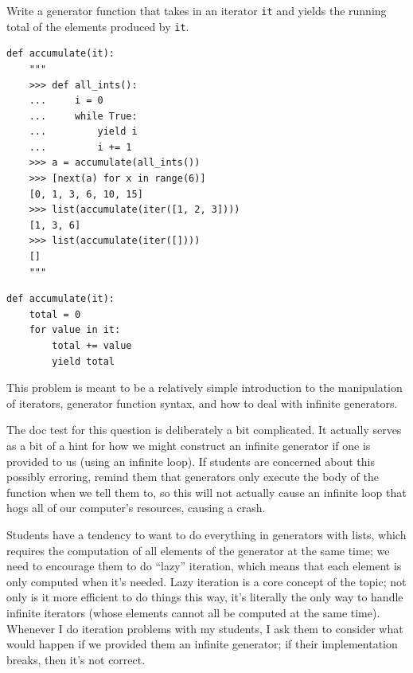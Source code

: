 \begin{blocksection}
\question Write a generator function that takes in an iterator \lstinline{it} and yields the running total of the elements produced by \lstinline{it}. 

\begin{lstlisting}
def accumulate(it):
    """
    >>> def all_ints():
    ...     i = 0
    ...     while True:
    ...         yield i
    ...         i += 1
    >>> a = accumulate(all_ints())
    >>> [next(a) for x in range(6)]
    [0, 1, 3, 6, 10, 15]
    >>> list(accumulate(iter([1, 2, 3])))
    [1, 3, 6]
    >>> list(accumulate(iter([])))
    []
    """
\end{lstlisting}

\begin{solution}[2in]
\begin{lstlisting}
def accumulate(it):
    total = 0
    for value in it:
        total += value
        yield total
\end{lstlisting}
\end{solution}
\end{blocksection}

\begin{questionmeta}
This problem is meant to be a relatively simple introduction to the manipulation of iterators, generator function syntax, and how to deal with infinite generators. 

The doc test for this question is deliberately a bit complicated. It actually serves as a bit of a hint for how we might construct an infinite generator if one is provided to us (using an infinite loop). If students are concerned about this possibly erroring, remind them that generators only execute the body of the function when we tell them to, so this will not actually cause an infinite loop that hogs all of our computer's resources, causing a crash. 

Students have a tendency to want to do everything in generators with lists, which requires the computation of all elements of the generator at the same time; we need to encourage them to do ``lazy'' iteration, which means that each element is only computed when it's needed. Lazy iteration is a core concept of the topic; not only is it more efficient to do things this way, it's literally the only way to handle infinite iterators (whose elements cannot all be computed at the same time). Whenever I do iteration problems with my students, I ask them to consider what would happen if we provided them an infinite generator; if their implementation breaks, then it's not correct. 
\end{questionmeta}